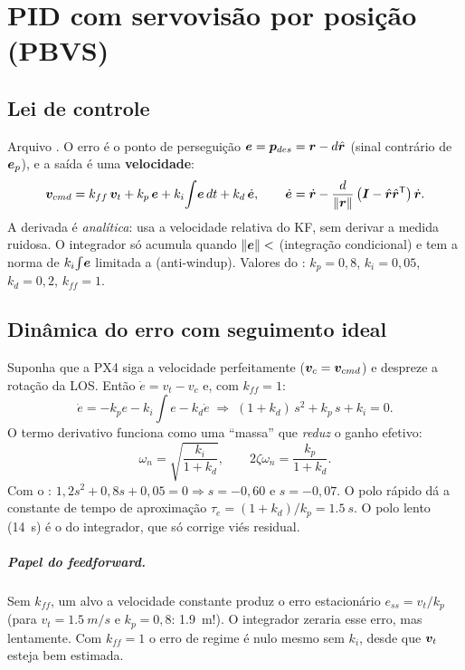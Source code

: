 \chapter{PID com servovisão por posição (PBVS)}
\label{cap:pid}

\section{Lei de controle}
Arquivo . O erro é o ponto de perseguição
$\bm{e} = \bm{p}_{des} = \bm{r} - d\hat{\bm{r}}$ (sinal contrário de $\bm{e}_p$), e a saída é uma
\textbf{velocidade}:
\begin{equation}
  \bm{v}_{cmd} = k_{ff}\,\bm{v}_t + k_p\,\bm{e} + k_i\!\int\!\bm{e}\,dt + k_d\,\dot{\bm{e}},
  \qquad
  \dot{\bm{e}} = \dot{\bm{r}} - \frac{d}{\lVert\bm{r}\rVert}\left(\bm{I}-\hat{\bm{r}}\hat{\bm{r}}^{\mathsf{T}}\right)\dot{\bm{r}} .
  \label{eq:pid}
\end{equation}
A derivada é \emph{analítica}: usa a velocidade relativa do KF, sem derivar a medida
ruidosa. O integrador só acumula quando $\lVert\bm{e}\rVert<$ 
(integração condicional) e tem a norma de $k_i\!\int\!\bm{e}$ limitada a
 (anti-windup). Valores do : $k_p=0{,}8$, $k_i=0{,}05$,
$k_d=0{,}2$, $k_{ff}=1$.

\section{Dinâmica do erro com seguimento ideal}
Suponha que a PX4 siga a velocidade perfeitamente ($\bm{v}_c=\bm{v}_{cmd}$) e despreze
a rotação da LOS. Então $\dot e = v_t - v_c$ e, com $k_{ff}=1$:
\begin{equation}
  \dot e = -k_p e - k_i\!\int\! e - k_d\dot e
  \;\Longrightarrow\;
  (1+k_d)\,s^2 + k_p\,s + k_i = 0 .
  \label{eq:pid-car}
\end{equation}
O termo derivativo funciona como uma ``massa'' que \emph{reduz} o ganho efetivo:
\begin{equation}
  \omega_n = \sqrt{\frac{k_i}{1+k_d}},\qquad
  2\zeta\omega_n = \frac{k_p}{1+k_d}.
\end{equation}
Com o : $1{,}2s^2+0{,}8s+0{,}05=0\Rightarrow s=-0{,}60$ e $s=-0{,}07$. O polo
rápido dá a constante de tempo de aproximação
$\tau_e=(1+k_d)/k_p=\SI{1,5}{s}$. O polo lento (\SI{14}{s}) é o do integrador, que só
corrige viés residual.

\paragraph{Papel do feedforward.} Sem $k_{ff}$, um alvo a velocidade constante produz o
erro estacionário $e_{ss}=v_t/k_p$ (para $v_t=\SI{1,5}{m/s}$ e $k_p=0{,}8$: \SI{1,9}{m}!).
O integrador zeraria esse erro, mas lentamente. Com $k_{ff}=1$ o erro de regime é nulo
mesmo sem $k_i$, desde que $\bm{v}_t$ esteja bem estimada.

